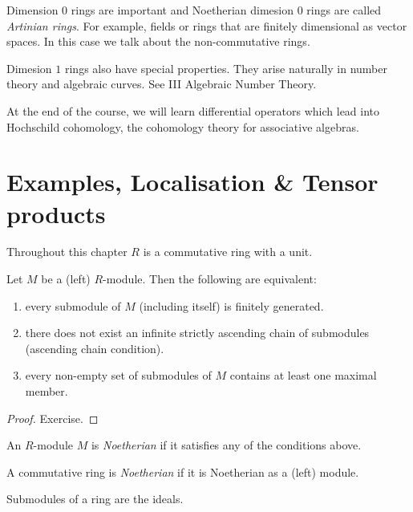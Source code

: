 \documentclass[a4paper]{article}
\begin{document}
Dimension \(0\) rings are important and Noetherian dimesion \(0\) rings are called \emph{Artinian rings}. For example, fields or rings that are finitely dimensional as vector spaces. In this case we talk about the non-commutative rings.

Dimesion \(1\) rings also have special properties. They arise naturally in number theory and algebraic curves. See III Algebraic Number Theory.

At the end of the course, we will learn differential operators which lead into Hochschild cohomology, the cohomology theory for associative algebras.

\section{Examples, Localisation \& Tensor products}

Throughout this chapter \(R\) is a commutative ring with a unit.

\begin{lemma}
  Let \(M\) be a (left) \(R\)-module. Then the following are equivalent:
  \begin{enumerate}
  \item every submodule of \(M\) (including itself) is finitely generated.
  \item there does not exist an infinite strictly ascending chain of submodules (ascending chain condition).
  \item every non-empty set of submodules of \(M\) contains at least one maximal member.
  \end{enumerate}
\end{lemma}

\begin{proof}
  Exercise.
\end{proof}

\begin{definition}
  An \(R\)-module \(M\) is \emph{Noetherian} if it satisfies any of the conditions above.
\end{definition}

\begin{definition}
  A commutative ring is \emph{Noetherian} if it is Noetherian as a (left) module.
\end{definition}

\begin{remark}
  Submodules of a ring are the ideals.
\end{remark}
\end{document}
